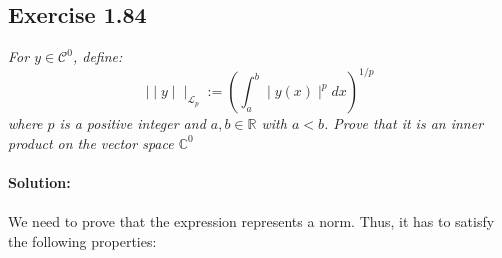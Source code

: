 \subsection{Exercise 1.84}
\emph{For $y \in \mathcal{C}^0$, define:}
\begin{equation}
    \mid\mid y \mid \mid _{\mathcal{L}_p} := \left( \int_a^b \mid y(x) \mid ^p dx \right) ^{1/p}
\end{equation}
\emph{where $p$ is a positive integer and $a, b \in \mathbb{R}$ with $a < b$. Prove that it is an inner product on the vector space $\mathbb{C}^0$}\\
\\
\textbf{Solution:}\\
\\
We need to prove that the expression represents a norm. Thus, it has to satisfy the following properties:

